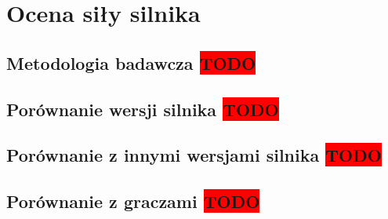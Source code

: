 
\chapter {Ocena siły silnika}
\label {ch: ocena-sily-silnika}

\section {Metodologia badawcza \colorbox{red}{TODO}}
\label {sec: metodologia-badawcza}

\section {Porównanie wersji silnika \colorbox{red}{TODO}}
\label {sec: porownanie-wersji-silnika}

\section {Porównanie z innymi wersjami silnika \colorbox{red}{TODO}}
\label {sec: porownianie-z-silnikami}

\section {Porównanie z graczami \colorbox{red}{TODO}}
\label {sec: porownanie-z-graczami}

